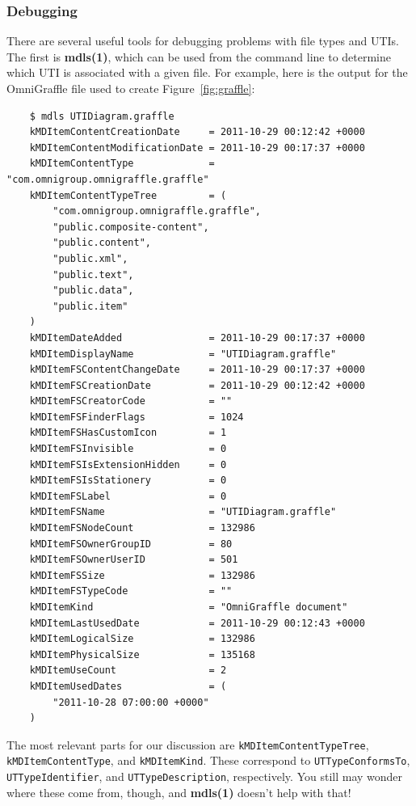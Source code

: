 \documentclass[11pt]{article}
\begin{document}
\subsubsection{Debugging}
There are several useful tools for debugging problems with file types and
UTIs. The first is \textbf{mdls(1)}, which can be used from the command
line to determine which UTI is associated with a given file. For example,
here is the output for the OmniGraffle file used to create Figure~\ref{fig:graffle}:
\begin{verbatim}
    $ mdls UTIDiagram.graffle 
    kMDItemContentCreationDate     = 2011-10-29 00:12:42 +0000
    kMDItemContentModificationDate = 2011-10-29 00:17:37 +0000
    kMDItemContentType             = "com.omnigroup.omnigraffle.graffle"
    kMDItemContentTypeTree         = (
        "com.omnigroup.omnigraffle.graffle",
        "public.composite-content",
        "public.content",
        "public.xml",
        "public.text",
        "public.data",
        "public.item"
    )
    kMDItemDateAdded               = 2011-10-29 00:17:37 +0000
    kMDItemDisplayName             = "UTIDiagram.graffle"
    kMDItemFSContentChangeDate     = 2011-10-29 00:17:37 +0000
    kMDItemFSCreationDate          = 2011-10-29 00:12:42 +0000
    kMDItemFSCreatorCode           = ""
    kMDItemFSFinderFlags           = 1024
    kMDItemFSHasCustomIcon         = 1
    kMDItemFSInvisible             = 0
    kMDItemFSIsExtensionHidden     = 0
    kMDItemFSIsStationery          = 0
    kMDItemFSLabel                 = 0
    kMDItemFSName                  = "UTIDiagram.graffle"
    kMDItemFSNodeCount             = 132986
    kMDItemFSOwnerGroupID          = 80
    kMDItemFSOwnerUserID           = 501
    kMDItemFSSize                  = 132986
    kMDItemFSTypeCode              = ""
    kMDItemKind                    = "OmniGraffle document"
    kMDItemLastUsedDate            = 2011-10-29 00:12:43 +0000
    kMDItemLogicalSize             = 132986
    kMDItemPhysicalSize            = 135168
    kMDItemUseCount                = 2
    kMDItemUsedDates               = (
        "2011-10-28 07:00:00 +0000"
    )
\end{verbatim}
The most relevant parts for our discussion are \texttt{kMDItemContentTypeTree},
\texttt{kMDItemContentType}, and \texttt{kMDItemKind}. These correspond to
\texttt{UTTypeConformsTo}, \texttt{UTTypeIdentifier}, and \texttt{UTTypeDescription},
respectively. You still may wonder where these come from, though, and
\textbf{mdls(1)} doesn't help with that! 
\end{document}

